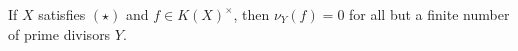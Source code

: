 If $X$ satisfies $(\star)$ and $f \in K(X)^\times$, then $\nu_Y(f) = 0$ for
all but a finite number of prime divisors $Y$.
